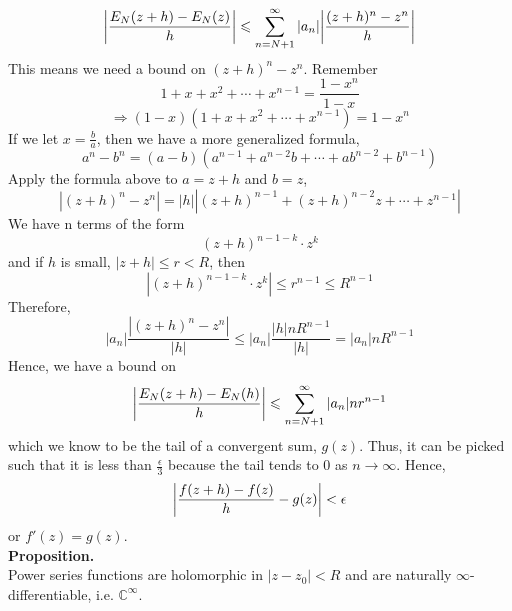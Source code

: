 \documentclass[11pt]{article}
\DeclarePairedDelimiter\abs{\lvert}{\rvert}
\begin{document}
$$\abs*{\frac{E_N(z + h) - E_N(z)}{h}} \leqslant \sum_{n = N + 1}^{\infty} |a_n|\abs*{\frac{(z + h)^n - z^n}{h}} $$
This means we need a bound on $(z + h)^n - z^n$. Remember 
$$1 + x + x^2 + \cdots + x^{n - 1} = \frac{1 - x^n}{1 - x}$$
$$\Rightarrow (1 - x) (1 + x + x^2 + \cdots + x^{n - 1}) = 1 - x^n$$
If we let $x = \frac{b}{a}$, then we have a more generalized formula, 
$$a^n - b^n = (a - b)(a^{n - 1} + a^{n - 2}b + \cdots + ab^{n - 2} + b^{n - 1})$$
Apply the formula above to $a = z + h$ and $b = z$, 
$$|(z + h)^n - z^n| = |h||(z+h)^{n - 1} + (z+h)^{n - 2}z + \cdots + z^{n - 1}|$$
We have n terms of the form 
$$(z + h)^{n - 1 - k} \cdot z^k$$
and if $h$ is small, $|z+h| \leqslant r < R$, then 
$$|(z + h)^{n - 1 - k} \cdot z^k| \leqslant r^{n -1} \leqslant R^{n - 1}$$
Therefore, 
$$ |a_n|\frac{|(z+h)^n - z^n|}{|h|} \leqslant |a_n|\frac{|h|nR^{n - 1}}{|h|} = |a_n|nR^{n -1} $$
Hence, we have a bound on
$$\abs*{\frac{E_N(z+h) - E_N(h)}{h}} \leqslant \sum_{n = N + 1}^{\infty} |a_n|nr^{n - 1}$$
which we know to be the tail of a convergent sum, $g(z)$. Thus, it can be picked such that it is less than $\frac{\epsilon}{3}$ because the tail tends to 0 as $n \to \infty$. Hence, 
$$\abs*{\frac{f(z+h)-f(z)}{h} - g(z)} < \epsilon$$
or $f'(z) = g(z)$. \\
\newline
\textbf{Proposition.} \\
Power series functions are holomorphic in $|z - z_0| < R$ and are naturally $\infty$-differentiable, i.e. $\mathbb{C}^\infty$.

\newpage
\end{document}
